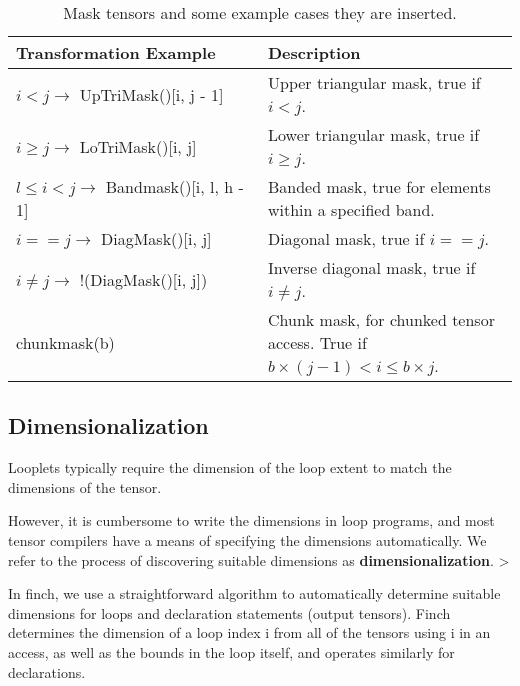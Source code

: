     \begin{table}[h]
        \centering
        \begin{tabular}{|>{\raggedright\arraybackslash}p{0.5\linewidth}|>{\raggedright\arraybackslash}p{0.5\linewidth}|}
        \hline
        \textbf{Transformation Example} & \textbf{Description} \\
        \hline
        $i < j \rightarrow$ UpTriMask()[i, j - 1] & Upper triangular mask, true if $i < j$. \\
        \hline
        $i \geq j \rightarrow$ LoTriMask()[i, j] & Lower triangular mask, true if $i \geq j$. \\
        \hline
        $l \leq i < j \rightarrow$ Bandmask()[i, l, h - 1] & Banded mask, true for elements within a specified band. \\
        \hline
        $i == j \rightarrow$ DiagMask()[i, j] & Diagonal mask, true if $i == j$. \\
        \hline
        $i \neq j \rightarrow$ !(DiagMask()[i, j]) & Inverse diagonal mask, true if $i \neq j$. \\
        \hline
        chunkmask(b) & Chunk mask, for chunked tensor access. True if $b \times (j - 1) < i \leq b \times j$. \\
        \hline
        \end{tabular}
        \caption{Mask tensors and some example cases they are inserted.}
        \label{table:masks}
    \end{table}
    
\subsection{Dimensionalization}
    Looplets typically require the dimension of the loop extent to match the
    dimensions of the tensor. 

    
    However, it is cumbersome to write the dimensions
    in loop programs, and most tensor compilers have a means of specifying the
    dimensions automatically. We refer to the process of discovering suitable
    dimensions as \textbf{dimensionalization}. >

    In finch, we use a straightforward algorithm to automatically determine
    suitable dimensions for loops and declaration statements (output tensors).
    Finch determines the dimension of a loop index i from all of the tensors
    using i in an access, as well as the bounds in the loop itself, and operates
    similarly for declarations.


